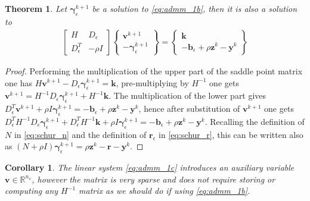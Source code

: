 \documentclass[final,3p]{elsarticle}
\newcommand{\vect}[1]{\bm{#1}}
\newtheorem{theorem}{Theorem}[section]
\newtheorem{corollary}{Corollary}[theorem]
\begin{document}
\begin{theorem}
\label{th:schurtokkt}
Let $\vect{\gamma}_\epsilon^{k+1}$ be a solution to \eqref{eq:admm_1b}, then it is also a solution to
%
\begin{subequations}
	\begin{align}
    \begin{bmatrix}
		 H   & D_\epsilon \\
		 D_\epsilon^T & - \rho I
		\end{bmatrix}
		\begin{Bmatrix}
		 \vect{v}^{k+1}   \\
		 -\vect{\gamma}_\epsilon^{k+1} 
		\end{Bmatrix}
		=
		\begin{Bmatrix}
		 \vect{k} \\
		 -\vect{b}_\epsilon + \rho \vect{z}^k -\vect{y}^k 
		\end{Bmatrix}
	\end{align}
	\label{eq:admm_1c}
\end{subequations}
%
\end{theorem}

\begin{proof}
Performing the multiplication of the upper part of the saddle point matrix one has 
$H \vect{v}^{k+1} - D_\epsilon \vect{\gamma}_\epsilon^{k+1} = \vect{k}$,
pre-multiplying by $H^{-1}$ one gets 
$\vect{v}^{k+1} = H^{-1} D_\epsilon \vect{\gamma}_\epsilon^{k+1} + H^{-1} \vect{k}$. 
The multiplication of the lower part gives 
$D_\epsilon^T \vect{v}^{k+1} + \rho I \vect{\gamma}_\epsilon^{k+1} = -\vect{b}_\epsilon + \rho \vect{z}^k -\vect{y}^k $, 
hence after substitution of $\vect{v}^{k+1}$ one gets
$D_\epsilon^T H^{-1} D_\epsilon \vect{\gamma}_\epsilon^{k+1}  + D_\epsilon^T H^{-1} \vect{k} + \rho I \vect{\gamma}_\epsilon^{k+1} = -\vect{b}_\epsilon + \rho \vect{z}^k -\vect{y}^k$. 
Recalling the definition of $N$ in \eqref{eq:schur_n} and the definition of $\vect{r}_\epsilon$ in \eqref{eq:schur_r}, this can be written also as 
$(N + \rho I) \vect{\gamma}_\epsilon^{k+1} =  \rho \vect{z}^k - \vect{r} - \vect{y}^k$. 
\end{proof}

\begin{corollary}
The linear system \eqref{eq:admm_1c} introduces an auxiliary variable $\vect{v} \in \mathbb{R}^{n_v}$, however the matrix is very sparse and does not require storing or computing any $H^{-1}$ matrix as we should do if using \eqref{eq:admm_1b}.
\end{corollary}
\end{document}
